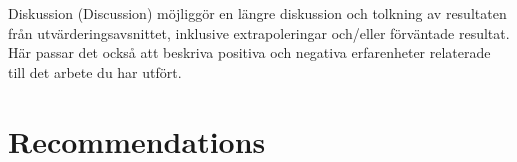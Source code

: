 Diskussion (Discussion) möjliggör en längre diskussion och tolkning av resultaten från utvärderingsavsnittet, inklusive extrapoleringar och/eller förväntade resultat. Här passar det också att beskriva positiva och negativa erfarenheter relaterade till det arbete du har utfört.

\section{Recommendations}
\fi